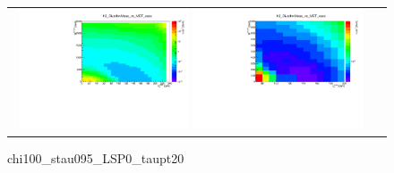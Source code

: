 \begin{figure}[tbh!]
	\centering
	\begin{tabular}{cc}
		\includegraphics[width=0.48\textwidth]{analysis/pics/chi100_stau095_LSP0_taupt20.pdf}
		\includegraphics[width=0.48\textwidth]{analysis/pics/chi100_stau095_LSP0_taupt20_zoom.pdf} 		
	\end{tabular}
	\caption{chi100\_stau095\_LSP0\_taupt20}
\end{figure}
